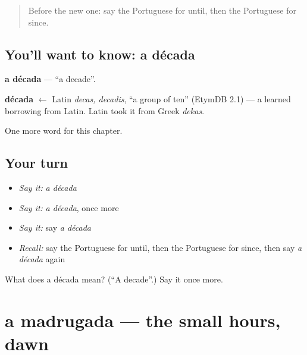\label{lesson:PT-C182-decada}



\begin{quote}
Before the new one: say the Portuguese for until, then the Portuguese for since.
\end{quote}

\subsection*{You'll want to know: a década}
\textbf{a década} — \textquotedblleft{}a decade\textquotedblright{}.

\begin{cousinweb}
\textbf{década} $\leftarrow$ Latin \emph{decas, decadis}, \textquotedblleft{}a group of ten\textquotedblright{} (EtymDB 2.1) — a learned borrowing from Latin. Latin took it from Greek \emph{dekas}.
\end{cousinweb}

\begin{grammarlens}[title={What you've built}]
One more word for this chapter.
\end{grammarlens}

\subsection*{Your turn}
\begin{itemize}
\raggedright
  \item \emph{Say it:} \emph{a década}
  \item \emph{Say it:} \emph{a década}, once more
  \item \emph{Say it:} say \emph{a década}
  \item \emph{Recall:} say the Portuguese for until, then the Portuguese for since, then say \emph{a década} again
\end{itemize}

\begin{tcolorbox}[breakable,colback=teal!4,colframe=teal!35!black,title={Before you move on}]
What does a década mean? (\textquotedblleft{}A decade\textquotedblright{}.) Say it once more.
\end{tcolorbox}
\section[a madrugada]{a madrugada — the small hours, dawn}

\label{lesson:PT-C182-madrugada}



